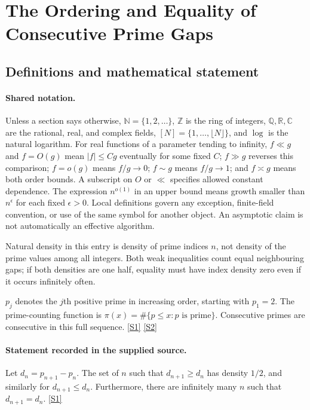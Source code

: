 \documentclass[11pt,a4paper]{article}
\newcommand{\N}{\mathbb{N}}
\newcommand{\Z}{\mathbb{Z}}
\newcommand{\Q}{\mathbb{Q}}
\newcommand{\R}{\mathbb{R}}
\newcommand{\C}{\mathbb{C}}
\newcommand{\sref}[2]{\hyperlink{source:#1:#2}{[S#2]}}
\begin{document}
\section{The Ordering and Equality of Consecutive Prime Gaps}\label{statement}


\subsection{Definitions and mathematical statement}

\paragraph{Shared notation.}Unless a section says otherwise, $\N=\{1,2,\ldots\}$,
$\Z$ is the ring of integers, $\Q,\R,\C$ are the rational, real, and complex
fields, $[N]=\{1,\ldots,\lfloor N\rfloor\}$, and $\log$ is the natural
logarithm. For real functions of a parameter tending to infinity,
$f\ll g$ and $f=O(g)$ mean $|f|\leq Cg$ eventually for some fixed $C$;
$f\gg g$ reverses this comparison; $f=o(g)$ means $f/g\to0$;
$f\sim g$ means $f/g\to1$; and $f\asymp g$ means both order bounds.
A subscript on $O$ or $\ll$ specifies allowed constant dependence.
The expression $n^{o(1)}$ in an upper bound means growth smaller than
$n^\epsilon$ for each fixed $\epsilon>0$. Local definitions govern any
exception, finite-field convention, or use of the same symbol for another
object. An asymptotic claim is not automatically an effective algorithm.



Natural density in this entry is density of prime indices $n$, not density of the prime values among all integers. Both weak inequalities count equal neighbouring gaps; if both densities are one half, equality must have index density zero even if it occurs infinitely often.

$p_j$ denotes the $j$th positive prime in increasing order, starting with $p_1=2$. The prime-counting function is $\pi(x)=\#\{p\leq x:p\text{ is prime}\}$. Consecutive primes are consecutive in this full sequence. \sref{statement}{1} \sref{statement}{2}

\paragraph{Statement recorded in the supplied source.}
Let $d_n=p_{n+1}-p_n$. The set of $n$ such that $d_{n+1}\geq d_n$ has density $1/2$, and similarly for $d_{n+1}\leq d_n$. Furthermore, there are infinitely many $n$ such that $d_{n+1}=d_n$. \sref{statement}{1}
\end{document}
